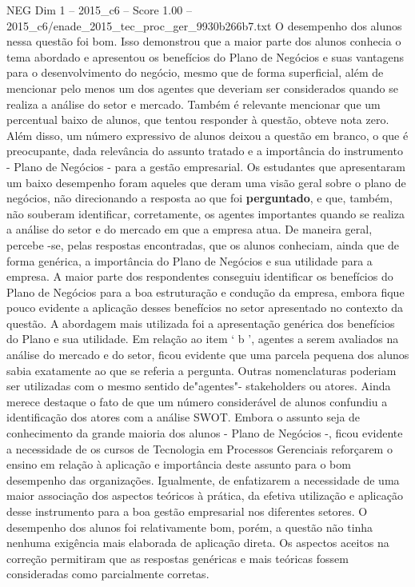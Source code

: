 \begin{textsample}{NEG Dim 1 – 2015\_c6 – Score 1.00 – 2015\_c6/enade\_2015\_tec\_proc\_ger\_9930b266b7.txt}
O desempenho dos alunos nessa questão foi bom.
Isso demonstrou que a maior parte dos alunos conhecia o tema abordado e apresentou os benefícios do Plano de Negócios e suas vantagens para o desenvolvimento do negócio, mesmo que de forma superficial, além de mencionar pelo menos um dos agentes que deveriam ser considerados quando se realiza a análise do setor e mercado.
Também é relevante mencionar que um percentual baixo de alunos, que tentou responder à questão, obteve nota zero.
Além disso, um número expressivo de alunos deixou a questão em branco, o que é preocupante, dada relevância do assunto tratado e a importância do instrumento - Plano de Negócios - para a gestão empresarial.
Os estudantes que apresentaram um baixo desempenho foram aqueles que deram uma visão geral sobre o plano de negócios, não direcionando a resposta ao que foi \textbf{perguntado}, e que, também, não souberam identificar, corretamente, os agentes importantes quando se realiza a análise do setor e do mercado em que a empresa atua.
De maneira geral, percebe -se, pelas respostas encontradas, que os alunos conheciam, ainda que de forma genérica, a importância do Plano de Negócios e sua utilidade para a empresa.
A maior parte dos respondentes conseguiu identificar os benefícios do Plano de Negócios para a boa estruturação e condução da empresa, embora fique pouco evidente a aplicação desses benefícios no setor apresentado no contexto da questão.
A abordagem mais utilizada foi a apresentação genérica dos benefícios do Plano e sua utilidade.
Em relação ao item ‘ b ’, agentes a serem avaliados na análise do mercado e do setor, ficou evidente que uma parcela pequena dos alunos sabia exatamente ao que se referia a pergunta.
Outras nomenclaturas poderiam ser utilizadas com o mesmo sentido de"agentes"- stakeholders ou atores.
Ainda merece destaque o fato de que um número considerável de alunos confundiu a identificação dos atores com a análise SWOT.
Embora o assunto seja de conhecimento da grande maioria dos alunos - Plano de Negócios -, ficou evidente a necessidade de os cursos de Tecnologia em Processos Gerenciais reforçarem o ensino em relação à aplicação e importância deste assunto para o bom desempenho das organizações.
Igualmente, de enfatizarem a necessidade de uma maior associação dos aspectos teóricos à prática, da efetiva utilização e aplicação desse instrumento para a boa gestão empresarial nos diferentes setores.
O desempenho dos alunos foi relativamente bom, porém, a questão não tinha nenhuma exigência mais elaborada de aplicação direta.
Os aspectos aceitos na correção permitiram que as respostas genéricas e mais teóricas fossem consideradas como parcialmente corretas.

\end{textsample}
